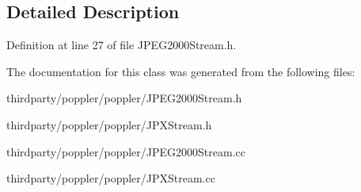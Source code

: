\subsection{Detailed Description}


Definition at line 27 of file J\+P\+E\+G2000\+Stream.\+h.



The documentation for this class was generated from the following files\+:\begin{DoxyCompactItemize}
\item 
thirdparty/poppler/poppler/J\+P\+E\+G2000\+Stream.\+h\item 
thirdparty/poppler/poppler/J\+P\+X\+Stream.\+h\item 
thirdparty/poppler/poppler/J\+P\+E\+G2000\+Stream.\+cc\item 
thirdparty/poppler/poppler/J\+P\+X\+Stream.\+cc\end{DoxyCompactItemize}
